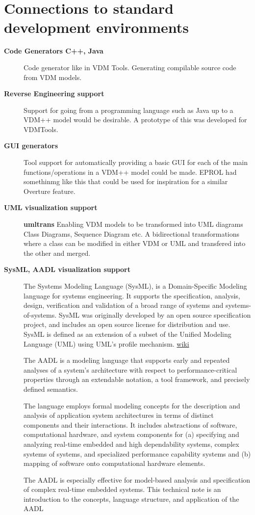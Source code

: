 \documentclass[11pt,a4paper,oneside]{report}
\begin{document}
\section{Connections to standard development environments}
\begin{description}
	\item[\textbf{Code Generators C++, Java}] Code generator like in VDM Tools. Generating compilable source code from VDM models.

	\item[\textbf{Reverse Engineering support}] Support for going
          from a programming language such as Java up to a VDM++ model
          would be desirable. A prototype of this was developed for VDMTools.

	\item[\textbf{GUI generators}] Tool support for automatically
          providing a basic GUI for each of the main
          functions/operations in a VDM++ model could be made. EPROL
          had somethinmg like this that could be used for inspiration
          for a similar Overture feature.
     
	\item[\textbf{UML visualization support}] \textbf{umltrans}
Enabling VDM models to be transformed into UML diagrams Class Diagrams, Sequence Diagram etc. A bidirectional transformations where a class can be modified in either VDM or UML and transfered into the other and merged.
	\item[\textbf{SysML, AADL visualization support}] 
The Systems Modeling Language (SysML), is a Domain-Specific Modeling language for systems engineering. It supports the specification, analysis, design, verification and validation of a broad range of systems and systems-of-systems. SysML was originally developed by an open source specification project, and includes an open source license for distribution and use. SysML is defined as an extension of a subset of the Unified Modeling Language (UML) using UML's profile mechanism. \href{http://en.wikipedia.org/wiki/Systems_Modeling_Language}{wiki}

The AADL is a modeling language that supports early and repeated analyses of a system's architecture with respect to performance-critical properties through an extendable notation, a tool framework, and precisely defined semantics.

The language employs formal modeling concepts for the description and analysis of application system architectures in terms of distinct components and their interactions. It includes abstractions of software, computational hardware, and system components for (a) specifying and analyzing real-time embedded and high dependability systems, complex systems of systems, and specialized performance capability systems and (b) mapping of software onto computational hardware elements.

The AADL is especially effective for model-based analysis and specification of complex real-time embedded systems. This technical note is an introduction to the concepts, language structure, and application of the AADL

\end{description}
\end{document}

